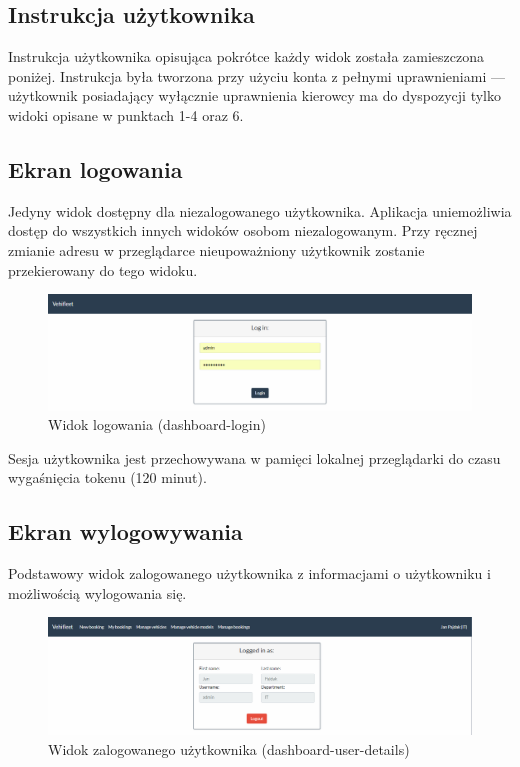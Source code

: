 \documentclass[eng,printmode,openany]{mgr}
\begin{document}
	
	
	\newpage	
	\begin{appendices}		
		\chapter{Instrukcja użytkownika}
		Instrukcja użytkownika opisująca pokrótce każdy widok została zamieszczona poniżej. Instrukcja była tworzona przy użyciu konta z pełnymi uprawnieniami — użytkownik posiadający wyłącznie uprawnienia kierowcy ma do dyspozycji tylko widoki opisane w punktach 1-4 oraz 6.
		
		\section{Ekran logowania}
		Jedyny widok dostępny dla niezalogowanego użytkownika. Aplikacja uniemożliwia dostęp do wszystkich innych widoków osobom niezalogowanym. Przy ręcznej zmianie adresu w przeglądarce nieupoważniony użytkownik zostanie przekierowany do tego widoku.
		\begin{figure}[H]
			\centering
			\includegraphics[width=\textwidth]{images/views/dashboard-login.png}
			\caption{Widok logowania (dashboard-login)}
		\end{figure}
		Sesja użytkownika jest przechowywana w pamięci lokalnej przeglądarki do czasu wygaśnięcia tokenu (120 minut).
		
		\newpage
		\section{Ekran wylogowywania}
		Podstawowy widok zalogowanego użytkownika z informacjami o użytkowniku i możliwością wylogowania się.
		\begin{figure}[H]
			\centering
			\includegraphics[width=\textwidth]{images/views/dashboard-logout.png}
			\caption{Widok zalogowanego użytkownika (dashboard-user-details)}
		\end{figure}
		

\end{appendices}
\end{document}
